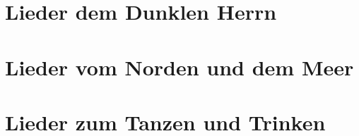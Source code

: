 \documentclass[12pt,a4paper]{article}
\begin{document}
    \tableofcontents

    \newpage
    \part{Lieder dem Dunklen Herrn}
    \newpage

    
    
    

    \newpage
    \part{Lieder vom Norden und dem Meer}
    \newpage

    
    
    
    
    

    \newpage
    \part{Lieder zum Tanzen und Trinken}
    \newpage

    
    
    
    
    
    


%    
%    
%     
%    
%    
\end{document}
